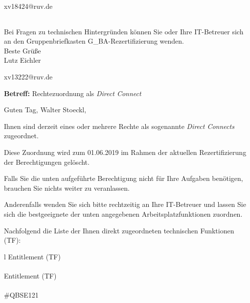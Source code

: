 \documentclass[a4paper,landscape,12pt]{letter}
\begin{document}
\begin{letter}{xv18424@ruv.de\hfill \break}
\begin{tiny}
\begin{longtable}{|p{35mm}|p{15mm}|p{25mm}|p{10mm}|p{40mm}|p{50mm}|p{50mm}|}
\hline
		\end{longtable}
		\end{tiny}
	
\begin{minipage}{\textwidth}
			Bei Fragen zu technischen Hintergründen können Sie 
			oder Ihre IT-Betreuer sich an den Gruppenbriefkasten 
			G\_BA-Rezertifizierung
			wenden.\\
			\linebreak
			Beste Grüße\\
			Lutz Eichler
	\end{minipage}
	\end{letter}
	
\begin{letter}{xv13222@ruv.de\hfill \break}
\begin{normalsize}
	\opening{\textbf{Betreff:} Rechtezuordnung als \emph{Direct Connect}}
	\begin{normalsize} \hfill
	\end{normalsize}

	\begin{normalsize}
		Guten Tag, 
	Walter Stoeckl, \hfill \break
	\end{normalsize}
	\end{normalsize}
	
\begin{normalsize}
	Ihnen sind derzeit eines oder mehrere Rechte als sogenannte \emph{Direct Connects} zugeordnet.
	
	Diese Zuordnung wird zum 01.06.2019 im Rahmen der aktuellen Rezertifizierung der Berechtigungen gelöscht.
	
	Falls Sie die unten aufgeführte Berechtigung nicht für Ihre Aufgaben benötigen, 
	brauchen Sie nichts weiter zu veranlassen.
	
	Anderenfalls wenden Sie sich bitte rechtzeitig an Ihre IT-Betreuer 
	und lassen Sie sich die bestgeeignete der unten angegebenen Arbeitsplatzfunktionen zuordnen.
	\end{normalsize}
	
\begin{normalsize}
	Nachfolgend die Liste der Ihnen direkt zugeordneten technischen Funktionen (TF):

	\begin{longtable}{l}
		Entitlement (TF) \\ \hline
		\endfirsthead
		\\\hline
		Entitlement (TF) \\ \hline
		\endhead %
		\multicolumn{1}{r@{}}{Fortsetzung \ldots}\\
		\endfoot
		\hline
		\endlastfoot
	\#QBSE121\\
	\end{longtable}
	\end{normalsize}
	

\end{letter}
\end{document}
